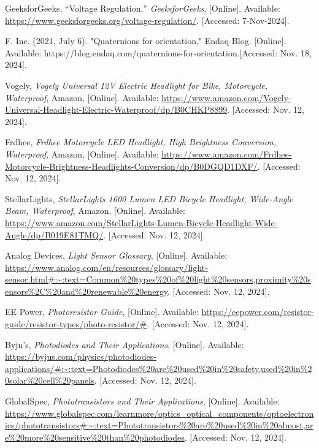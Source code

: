 \begin{thebibliography}{45}
	GeeksforGeeks, ``Voltage Regulation,'' \textit{GeeksforGeeks}, [Online]. Available: \url{https://www.geeksforgeeks.org/voltage-regulation/}. [Accessed: 7-Nov-2024].
	
	 F. Inc. (2021, July 6). "Quaternions for orientation," Endaq Blog. [Online]. Available: https://blog.endaq.com/quaternions-for-orientation.[Accessed: Nov. 18, 2024].

	Vogely, \textit{Vogely Universal 12V Electric Headlight for Bike, Motorcycle, Waterproof}, Amazon, [Online]. Available: \url{https://www.amazon.com/Vogely-Universal-Headlight-Electric-Waterproof/dp/B0CHKP8899}. [Accessed: Nov. 12, 2024].
	
	Frdhee, \textit{Frdhee Motorcycle LED Headlight, High Brightness Conversion, Waterproof}, Amazon, [Online]. Available: \url{https://www.amazon.com/Frdhee-Motorcycle-Brightness-Headlights-Conversion/dp/B0DGQD1DXF/}. [Accessed: Nov. 12, 2024].
	
	StellarLights, \textit{StellarLights 1600 Lumen LED Bicycle Headlight, Wide-Angle Beam, Waterproof}, Amazon, [Online]. Available: \url{https://www.amazon.com/StellarLights-Lumen-Bicycle-Headlight-Wide-Angle/dp/B019E81TMQ/}. [Accessed: Nov. 12, 2024].
	
	Analog Devices, \textit{Light Sensor Glossary}, [Online]. Available: \url{https://www.analog.com/en/resources/glossary/light-sensor.html#:~:text=Common%20types%20of%20light%20sensors,proximity%20sensors%2C%20and%20renewable%20energy}. [Accessed: Nov. 12, 2024].
	
	EE Power, \textit{Photoresistor Guide}, [Online]. Available: \url{https://eepower.com/resistor-guide/resistor-types/photo-resistor/#}. [Accessed: Nov. 12, 2024].
	
	Byju's, \textit{Photodiodes and Their Applications}, [Online]. Available: \url{https://byjus.com/physics/photodiodes-applications/#:~:text=Photodiodes%20are%20used%20in%20safety,used%20in%20solar%20cell%20panels}. [Accessed: Nov. 12, 2024].
	
	GlobalSpec, \textit{Phototransistors and Their Applications}, [Online]. Available: \url{https://www.globalspec.com/learnmore/optics_optical_components/optoelectronics/phototransistors#:~:text=Phototransistors%20are%20used%20in%20almost,are%20more%20sensitive%20than%20photodiodes}. [Accessed: Nov. 12, 2024].
	

\end{thebibliography}
